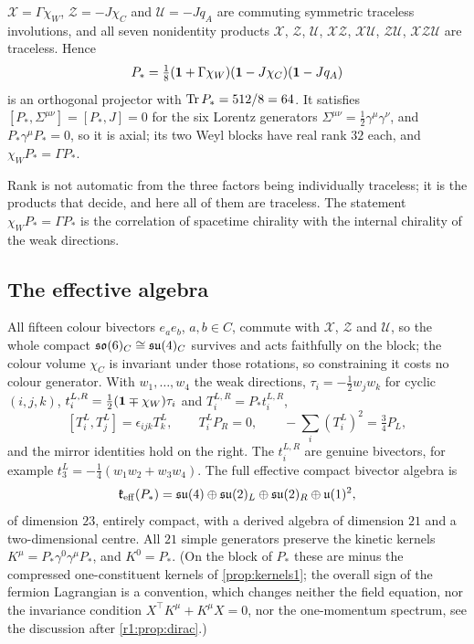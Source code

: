 \begin{theorem}
\label{thm:PS}
$\mathcal X=\Gamma\chi_W$, $\mathcal Z=-J\chi_C$ and $\mathcal U=-Jq_A$ are commuting symmetric traceless involutions, and all seven nonidentity products $\mathcal X$, $\mathcal Z$,
$\mathcal U$, $\mathcal{XZ}$, $\mathcal{XU}$, $\mathcal{ZU}$, $\mathcal{XZU}$ are traceless. Hence
\begin{equation}
\label{eq:Pstar}
P_*=\tfrac18(\mathbf 1+\Gamma\chi_W)(\mathbf 1-J\chi_C)(\mathbf 1-Jq_A)
\end{equation}
is an orthogonal projector with $\operatorname{Tr} P_*=512/8=64$. It satisfies $[P_*,\Sigma^{\mu\nu}]=[P_*,J]=0$ for the six Lorentz generators
$\Sigma^{\mu\nu}=\tfrac12\gamma^\mu\gamma^\nu$, and $P_*\gamma^\mu P_*=0$, so it is axial; its two Weyl blocks have real rank $32$ each, and
$\chi_WP_*=\Gamma P_*$.
\end{theorem}

Rank is not automatic from the three factors being individually traceless; it is the products that decide, and here all of them are
traceless. The statement $\chi_WP_*=\Gamma P_*$ is the correlation of spacetime chirality with the internal chirality of the weak
directions.

\subsection{The effective algebra}

\begin{theorem}
\label{thm:PSalg}
All fifteen colour bivectors $e_ae_b$, $a,b\in C$, commute with $\mathcal X$, $\mathcal Z$ and $\mathcal U$, so the whole compact $\mathfrak{so}(6)_C\cong\mathfrak{su}(4)_C$ survives
and acts faithfully on the block; the colour volume $\chi_C$ is invariant under those rotations, so constraining it costs no colour
generator. With $w_1,\dots,w_4$ the weak directions, $\tau_i=-\tfrac12w_jw_k$ for cyclic $(i,j,k)$, $t^{L,R}_i=\tfrac12(\mathbf 1\mp\chi_W)\tau_i$
and $T^{L,R}_i=P_*t^{L,R}_i$,
\[
[T^L_i,T^L_j]=\epsilon_{ijk}T^L_k,\qquad T^L_iP_R=0,\qquad -\sum_i(T^L_i)^2=\tfrac34P_L,
\]
and the mirror identities hold on the right. The $t^{L,R}_i$ are genuine bivectors, for example $t^L_3=-\tfrac14(w_1w_2+w_3w_4)$.
The full effective compact bivector algebra is
\[
\mathfrak k_{\rm eff}(P_*)=\mathfrak{su}(4)\oplus\mathfrak{su}(2)_L\oplus\mathfrak{su}(2)_R\oplus\mathfrak{u}(1)^2,
\]
of dimension $23$, entirely compact, with a derived algebra of dimension $21$ and a two-dimensional centre. All $21$ simple generators
preserve the kinetic kernels $K^\mu=P_*\gamma^0\gamma^\mu P_*$, and $K^0=P_*$. (On the block of $P_*$ these are minus the compressed
one-constituent kernels of \cref{prop:kernels1}; the overall sign of the fermion Lagrangian is a convention, which changes neither the
field equation, nor the invariance condition $X^{\!\top}K^\mu+K^\mu X=0$, nor the one-momentum spectrum, see the discussion after
\cref{r1:prop:dirac}.)
\end{theorem}

